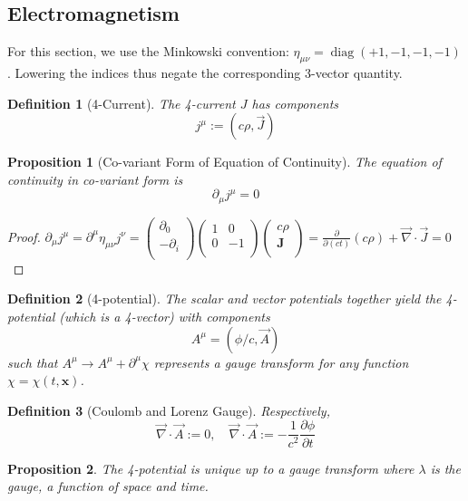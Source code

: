 \documentclass[a4paper]{article}
\DeclareMathOperator{\diag}{diag}
\theoremstyle{new}
\newtheorem{defi}{Definition}[section]
\newtheorem{prop}{Proposition}[section]
\begin{document}
\subsection{Electromagnetism}
For this section, we use the Minkowski convention: $\eta_{\mu\nu}=\diag(+1,-1,-1,-1)$. Lowering the indices thus negate the corresponding 3-vector quantity. 
\begin{defi}[4-Current]
The 4-current $J$ has components
\begin{equation}
j^\mu:=(c\rho,\vec{J})\label{4-current}
\end{equation}
\end{defi}
\begin{prop}[Co-variant Form of Equation of Continuity]
The equation of continuity in co-variant form is
\begin{equation}
\partial_\mu j^\mu=0\label{continuity}
\end{equation}
\end{prop}
\begin{proof}
$\partial_\mu j^\mu=\partial^\mu\eta_{\mu\nu}j^\nu=\begin{pmatrix}\partial_0\\-\partial_i\\\end{pmatrix}\begin{pmatrix}1&0\\0&-1\\\end{pmatrix}\begin{pmatrix}c\rho\\\mathbf{J}\\\end{pmatrix}=\frac{\partial}{\partial(ct)}(c\rho)+\vec{\nabla}\cdot\vec{J}=0$
\end{proof}
\begin{defi}[4-potential]
The scalar and vector potentials together yield the 4-potential (which is a 4-vector) with components
\begin{equation}
    A^\mu=(\phi/c,\vec{A})\label{4-potential}
\end{equation}
such that $A^\mu\rightarrow A^\mu+\partial^\mu\chi$ represents a gauge transform for any function $\chi=\chi(t,\mathbf{x})$.
\end{defi}
\begin{defi}[Coulomb and Lorenz Gauge]
Respectively,
$$\vec{\nabla}\cdot\vec{A}:=0,\quad \vec{\nabla}\cdot\vec{A}:=-\frac{1}{c^2}\frac{\partial\phi}{\partial t}$$
\end{defi}
\begin{prop}
The 4-potential is unique up to a gauge transform where $\lambda$ is the gauge, a function of space and time.
\end{prop}
\end{document}
